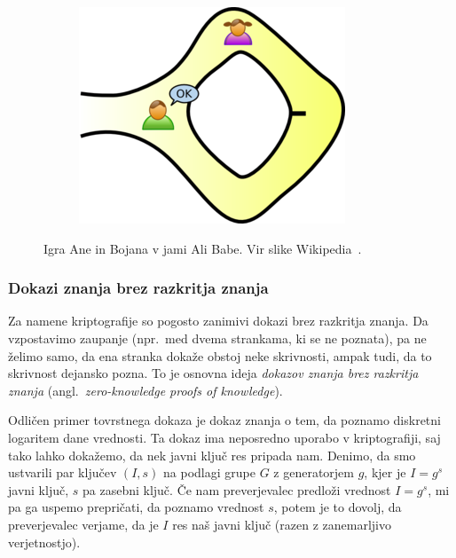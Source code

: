 \begin{primer}
\begin{figure}[ht]
\begin{subfigure}{0.25\textwidth}
        \end{subfigure}
        \hspace{0.25cm}
        \begin{subfigure}{0.25\textwidth}
            \includegraphics[width=\textwidth]{images/zkp3.png}
        \end{subfigure}
        \caption[Jama Ali Babe.]{Igra Ane in Bojana v jami Ali Babe. Vir slike Wikipedia~\cite{zkp}.}
        \label{fig:alibaba}
    \end{figure}
\end{primer}

\subsubsection{Dokazi znanja brez razkritja znanja}
Za namene kriptografije so pogosto zanimivi dokazi brez razkritja znanja. Da vzpostavimo zaupanje
(npr.\ med dvema strankama, ki se ne poznata), pa ne želimo samo, da ena stranka dokaže obstoj neke
skrivnosti, ampak tudi, da to skrivnost dejansko pozna. To je osnovna ideja \textit{dokazov znanja
brez razkritja znanja} (angl.\ \textit{zero-knowledge proofs of knowledge}).

Odličen primer tovrstnega dokaza je dokaz znanja o tem, da poznamo diskretni logaritem dane vrednosti.
Ta dokaz ima neposredno uporabo v kriptografiji, saj tako lahko dokažemo, da nek javni ključ res
pripada nam. Denimo, da smo ustvarili par ključev $(I, s)$ na podlagi grupe $G$ z generatorjem $g$,
kjer je $I = g^s$ javni ključ, $s$ pa zasebni ključ. Če nam preverjevalec predloži vrednost $I = g^s$,
mi pa ga uspemo prepričati, da poznamo vrednost $s$, potem je to dovolj, da preverjevalec verjame,
da je $I$ res naš javni ključ (razen z zanemarljivo verjetnostjo).

